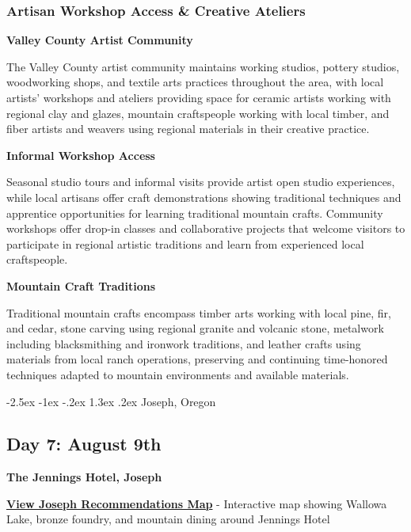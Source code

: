 \documentclass[
  11pt,
  letterpaper,
  DIV=10,
  numbers=noendperiod]{scrartcl}
\makeatletter
\renewcommand{\section}{\@startsection{section}{1}{\z@}%
  {-2.5ex \@plus -1ex \@minus -.2ex}%
  {1.3ex \@plus .2ex}%
  {\normalfont\fontsize{16}{19}\bfseries\color{twinpeaksred}}}
\makeatother
\begin{document}
\subsubsection{Artisan Workshop Access \& Creative
Ateliers}\label{artisan-workshop-access-creative-ateliers}

\textbf{Valley County Artist Community}

The Valley County artist community maintains working studios, pottery
studios, woodworking shops, and textile arts practices throughout the
area, with local artists' workshops and ateliers providing space for
ceramic artists working with regional clay and glazes, mountain
craftspeople working with local timber, and fiber artists and weavers
using regional materials in their creative practice.

\textbf{Informal Workshop Access}

Seasonal studio tours and informal visits provide artist open studio
experiences, while local artisans offer craft demonstrations showing
traditional techniques and apprentice opportunities for learning
traditional mountain crafts. Community workshops offer drop-in classes
and collaborative projects that welcome visitors to participate in
regional artistic traditions and learn from experienced local
craftspeople.

\textbf{Mountain Craft Traditions}

Traditional mountain crafts encompass timber arts working with local
pine, fir, and cedar, stone carving using regional granite and volcanic
stone, metalwork including blacksmithing and ironwork traditions, and
leather crafts using materials from local ranch operations, preserving
and continuing time-honored techniques adapted to mountain environments
and available materials.

\newpage

\section{Joseph, Oregon}\label{joseph-oregon}

\subsection{Day 7: August 9th}\label{day-7-august-9th}

\textbf{The Jennings Hotel, Joseph}

\textbf{\href{images/joseph_oregon_recommendations_map.html}{View Joseph
Recommendations Map}} - Interactive map showing Wallowa Lake, bronze
foundry, and mountain dining around Jennings Hotel
\end{document}
